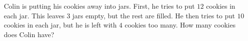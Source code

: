 Colin is putting his cookies away into jars. First, he tries to put $12$ cookies in each jar. This leaves $3$ jars empty, but the rest are filled. He then tries to put $10$ cookies in each jar, but he is left with $4$ cookies too many. How many cookies does Colin have?
